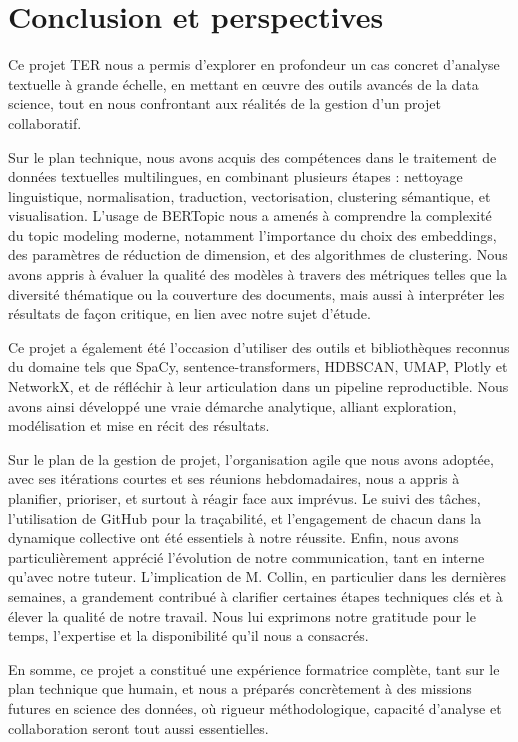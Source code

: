 \documentclass[mstat,12pt]{unswthesis}
\begin{document}
\hypertarget{conclusion-et-perspectives}{%
\chapter{Conclusion et perspectives}\label{conclusion-et-perspectives}}

Ce projet TER nous a permis d'explorer en profondeur un cas concret d’analyse textuelle à grande échelle, en mettant en œuvre des outils avancés de la data science, tout en nous confrontant aux réalités de la gestion d’un projet collaboratif.

Sur le plan technique, nous avons acquis des compétences dans le traitement de données textuelles multilingues, en combinant plusieurs étapes : nettoyage linguistique, normalisation, traduction, vectorisation, clustering sémantique, et visualisation. L’usage de BERTopic nous a amenés à comprendre la complexité du topic modeling moderne, notamment l’importance du choix des embeddings, des paramètres de réduction de dimension, et des algorithmes de clustering. Nous avons appris à évaluer la qualité des modèles à travers des métriques telles que la diversité thématique ou la couverture des documents, mais aussi à interpréter les résultats de façon critique, en lien avec notre sujet d’étude.

Ce projet a également été l’occasion d’utiliser des outils et bibliothèques reconnus du domaine tels que SpaCy, sentence-transformers, HDBSCAN, UMAP, Plotly et NetworkX, et de réfléchir à leur articulation dans un pipeline reproductible. Nous avons ainsi développé une vraie démarche analytique, alliant exploration, modélisation et mise en récit des résultats.

Sur le plan de la gestion de projet, l’organisation agile que nous avons adoptée, avec ses itérations courtes et ses réunions hebdomadaires, nous a appris à planifier, prioriser, et surtout à réagir face aux imprévus. Le suivi des tâches, l’utilisation de GitHub pour la traçabilité, et l’engagement de chacun dans la dynamique collective ont été essentiels à notre réussite.
Enfin, nous avons particulièrement apprécié l’évolution de notre communication, tant en interne qu’avec notre tuteur. L’implication de M. Collin, en particulier dans les dernières semaines, a grandement contribué à clarifier certaines étapes techniques clés et à élever la qualité de notre travail. Nous lui exprimons notre gratitude pour le temps, l’expertise et la disponibilité qu’il nous a consacrés.

En somme, ce projet a constitué une expérience formatrice complète, tant sur le plan technique que humain, et nous a préparés concrètement à des missions futures en science des données, où rigueur méthodologique, capacité d’analyse et collaboration seront tout aussi essentielles.
\end{document}
